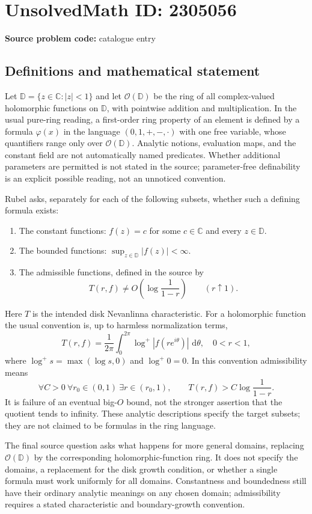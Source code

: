\documentclass[11pt]{article}
\newcommand{\C}{\mathbb{C}}
\newcommand{\dd}{\,\mathrm{d}}
\begin{document}
\section*{UnsolvedMath ID: 2305056}
\textbf{Source problem code:} catalogue entry
\subsection{Definitions and mathematical statement}
Let $\mathbb D=\{z\in\C:|z|<1\}$ and let $\mathcal O(\mathbb D)$ be the ring of all complex-valued holomorphic functions on $\mathbb D$, with pointwise addition and multiplication. In the usual pure-ring reading, a first-order ring property of an element is defined by a formula $\varphi(x)$ in the language $(0,1,+,-,\cdot)$ with one free variable, whose quantifiers range only over $\mathcal O(\mathbb D)$. Analytic notions, evaluation maps, and the constant field are not automatically named predicates. Whether additional parameters are permitted is not stated in the source; parameter-free definability is an explicit possible reading, not an unnoticed convention.

Rubel asks, separately for each of the following subsets, whether such a defining formula exists:
\begin{enumerate}
\item The constant functions: $f(z)=c$ for some $c\in\C$ and every $z\in\mathbb D$.
\item The bounded functions: $\sup_{z\in\mathbb D}|f(z)|<\infty$.
\item The admissible functions, defined in the source by
\[
T(r,f)\ne O\!\left(\log\frac1{1-r}\right)\qquad(r\uparrow1).
\]
\end{enumerate}
Here $T$ is the intended disk Nevanlinna characteristic. For a holomorphic function the usual convention is, up to harmless normalization terms,
\[
T(r,f)=\frac1{2\pi}\int_0^{2\pi}\log^+|f(re^{i\theta})|\,\dd\theta,
\quad 0<r<1,
\]
where $\log^+s=\max(\log s,0)$ and $\log^+0=0$. In this convention admissibility means
\[
\forall C>0\ \forall r_0\in(0,1)\ \exists r\in(r_0,1),\qquad
T(r,f)>C\log\frac1{1-r}.
\]
It is failure of an eventual big-$O$ bound, not the stronger assertion that the quotient tends to infinity. These analytic descriptions specify the target subsets; they are not claimed to be formulas in the ring language.

The final source question asks what happens for more general domains, replacing $\mathcal O(\mathbb D)$ by the corresponding holomorphic-function ring. It does not specify the domains, a replacement for the disk growth condition, or whether a single formula must work uniformly for all domains. Constantness and boundedness still have their ordinary analytic meanings on any chosen domain; admissibility requires a stated characteristic and boundary-growth convention.
\end{document}

